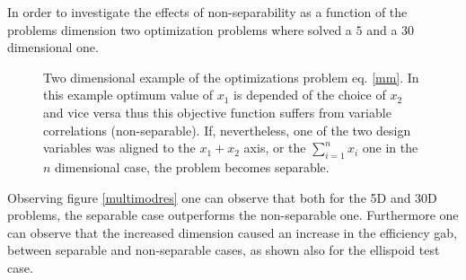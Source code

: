 In order to investigate the effects of non-separability as a function of the problems dimension two optimization problems where solved a $5$ and a $30$ dimensional one.  
\begin{figure}[h!]
\begin{minipage}[b]{1\linewidth}
 \centering
\end{minipage}
\begin{minipage}[b]{1\linewidth}
 \centering
\end{minipage}
\caption{Two dimensional example of the optimizations problem eq. \ref{mm}. In this example optimum value of $x_1$ is depended of the choice of $x_2$ and vice versa thus this objective function suffers from variable correlations (non-separable). If, nevertheless, one of the two design variables was aligned to the $x_1+x_2$ axis, or the $\sum^{n}_{i=1}x_i$ one in the $n$ dimensional case, the problem becomes separable.} 

\label{multimod}
\end{figure}

Observing figure \ref{multimodres} one can observe that both for the 5D and 30D problems, the separable case outperforms the non-separable one. Furthermore one can observe that the increased dimension caused an increase in the efficiency gab, between separable and non-separable cases, as shown also for the ellispoid test case. 



